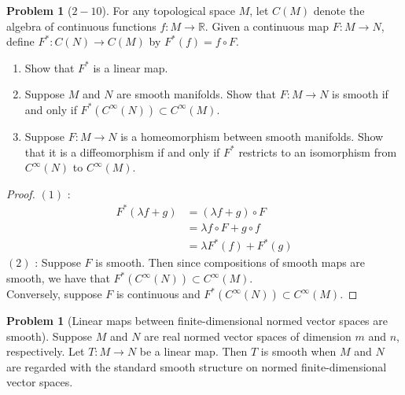 \documentclass[reqno]{amsart}
\theoremstyle{plain}%
\theoremstyle{definition}
\newtheorem{problem}[theorem]{Problem}
\theoremstyle{remark}
\begin{document}
    \begin{problem}[$2-10$]
        For any topological space $M$, let $C(M)$ denote the algebra of
        continuous functions $f  \colon M \to \mathbb{R}$. Given a continuous
        map $F  \colon M \to N$, define $F^{*} \colon
        C(N) \to C(M)$ by $F^{*}(f) = f \circ F$.
        \begin{enumerate}
            \item Show that $F^{*}$ is a linear map.
            \item Suppose $M$ and $N$ are smooth manifolds. Show that
                $F  \colon M \to N$ is smooth if and only if
                $F^{*} \left( C^{\infty}(N) \right) 
                \subset C^{\infty}(M)$.
            \item Suppose $F  \colon M \to N$ is a homeomorphism between
                smooth manifolds. Show that it is a diffeomorphism if
                and only if $F^{*}$ restricts to an isomorphism
                from $C^{\infty}(N)$ to $C^{\infty}(M)$.
        \end{enumerate}
    \end{problem}

    \begin{proof}
        $(1)$ : 
        \begin{align*}
            F^{*} (\lambda f+ g) 
            &= \left( \lambda f + g \right) \circ F\\
            &=\lambda f \circ F + g \circ f\\
            &= \lambda F^{*}(f) + F^{*}(g)
        \end{align*}
        $(2)$ : Suppose $F$ is smooth. Then since compositions of
        smooth maps are smooth, we have that
        $F^{*} \left( C^{\infty}(N) \right) \subset C^{\infty}(M)$.\\
        Conversely, suppose $F $ is continuous and
        $F^{*} \left( C^{\infty}(N) \right) \subset C^{\infty}(M)$.
    \end{proof}

    \begin{problem}[Linear maps between finite-dimensional normed vector spaces
        are smooth]
        Suppose $M$ and $N$ are real normed vector spaces of dimension $m$ and $n$,
        respectively. Let $T  \colon M \to N$ be a linear map. Then
        $T$ is smooth when $M$ and $N$ are regarded with the standard smooth
        structure on normed finite-dimensional vector spaces.
    \end{problem}
\end{document}
